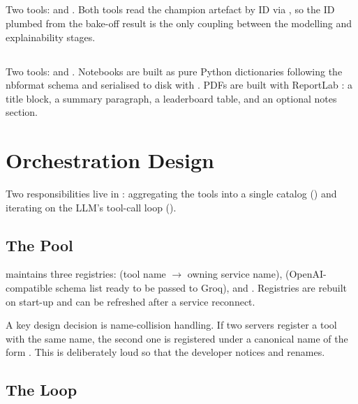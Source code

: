 \subsection{}
Two tools:  and
.
Both tools read the champion artefact by ID via
, so the ID plumbed from the bake-off
result is the only coupling between the modelling and explainability
stages.

\subsection{}
Two tools:  and
. Notebooks are built as pure Python
dictionaries following the nbformat schema and serialised to disk
with . PDFs are built with ReportLab
\citep{reportlab}: a title block, a summary paragraph, a leaderboard
table, and an optional notes section.

\section{Orchestration Design}
\label{sec:orch-design}

Two responsibilities live in : aggregating the
tools into a single catalog () and iterating on the
LLM's tool-call loop ().

\subsection{The Pool}
\label{sec:pool-design}

 maintains three registries: 
(tool name $\to$ owning service name), 
(OpenAI-compatible schema list ready to be passed to Groq), and
. Registries are rebuilt on start-up and can be
refreshed after a service reconnect.

A key design decision is name-collision handling. If two servers
register a tool with the same name, the second one is registered
under a canonical name of the form
. This is deliberately loud so
that the developer notices and renames.

\subsection{The Loop}
\label{sec:loop-design}

